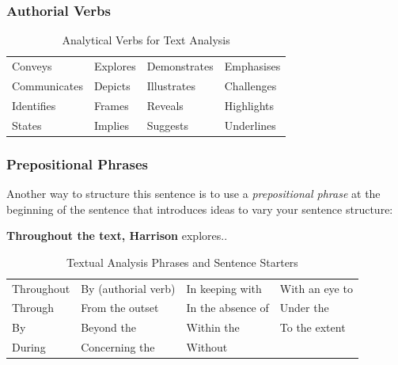 \documentclass[a4paper]{article}
\begin{document}
\subsubsection{Authorial Verbs}
\begin{longtable}{|p{3.5cm}|p{3.5cm}|p{3.5cm}|p{3.5cm}|}
\caption{Analytical Verbs for Text Analysis} \label{tab:analyticalverbs} \\
\hline

\hline
\endfirsthead

\hline

\hline
\endhead

\hline
\endfoot

Conveys     & Explores    & Demonstrates & Emphasises \\
Communicates & Depicts     & Illustrates  & Challenges \\
Identifies   & Frames      & Reveals      & Highlights \\
States       & Implies     & Suggests     & Underlines \\
\hline

\end{longtable}

\subsubsection{Prepositional Phrases}
Another way to structure this sentence is to use a \textit{prepositional phrase} at the beginning of the sentence that introduces ideas to vary your sentence structure:

\textbf{Throughout the text, Harrison} explores..\\

\begin{longtable}{|p{3.5cm}|p{3.5cm}|p{3.5cm}|p{3.5cm}|}
\caption{Textual Analysis Phrases and Sentence Starters} \label{tab:analysisphrases} \\
\hline
\hline
\endfirsthead

\hline
\hline
\endhead

\hline
\endfoot

Throughout           & By (authorial verb)     & In keeping with    & With an eye to \\
Through              & From the outset         & In the absence of  & Under the \\
By                   & Beyond the              & Within the         & To the extent \\
During               & Concerning the          & Without            &               \\
\hline

\end{longtable}
\end{document}
